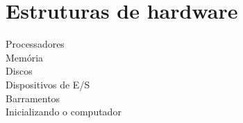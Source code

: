 \section{Estruturas de hardware}

Processadores\\
Memória\\
Discos\\
Dispositivos de E/S\\
Barramentos\\
Inicializando o computador\\